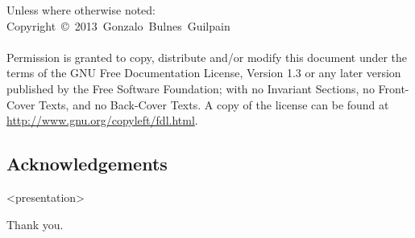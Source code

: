 \begin{frame}
    \scriptsize{Unless where otherwise noted:}\\
    \noindent\scriptsize{Copyright~\copyright~2013~Gonzalo~Bulnes~Guilpain}\\~\\

    \scriptsize{Permission is granted to copy, distribute and/or modify this document
    under the terms of the GNU Free Documentation License, Version 1.3
    or any later version published by the Free Software Foundation;
    with no Invariant Sections, no Front-Cover Texts, and no Back-Cover Texts.
    A copy of the license can be found at \url{http://www.gnu.org/copyleft/fdl.html}.}
  \end{frame}

%
\subsection{Acknowledgements}

  \begin{frame}<presentation>
    \vspace{0mm}
    \begin{center}
      Thank you.
    \end{center}
  \end{frame}
